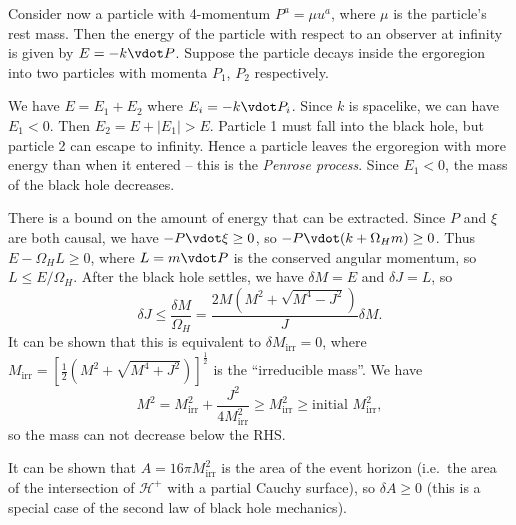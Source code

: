 \documentclass{jknotes}
\begin{document}
Consider now a particle with 4-momentum \(P^a = \mu u^a\), where \(\mu\) is the particle's rest mass. Then the energy of the particle with respect to an observer at infinity is given by \(E=-k\vdot P\). Suppose the particle decays inside the ergoregion into two particles with momenta \(P_1\), \(P_2\) respectively.
\begin{figure}[H]
    \centering
\end{figure}
We have \(E = E_1 + E_2\) where \(E_i=-k\vdot P_i\). Since \(k\) is spacelike, we can have \(E_1<0\). Then \(E_2=E+|E_1|>E\). Particle 1 must fall into the black hole, but particle 2 can escape to infinity. Hence a particle leaves the ergoregion with more energy than when it entered -- this is the \emph{Penrose process}. Since \(E_1<0\), the mass of the black hole decreases.

There is a bound on the amount of energy that can be extracted. Since \(P\) and \(\xi\) are both causal, we have \(-P\vdot\xi\ge0\), so \(-P\vdot(k+\Omega_H m)\ge 0\). Thus \(E-\Omega_HL\ge0\), where \(L=m\vdot P\) is the conserved angular momentum, so \(L\le E/\Omega_H\). After the black hole settles, we have \(\delta M=E\) and \(\delta J = L\), so
\begin{equation}
    \delta J \le \frac{\delta M}{\Omega_H} = \frac{2M(M^2+\sqrt{M^4-J^2})}{J}\delta M.
\end{equation}
It can be shown that this is equivalent to \(\delta M_{\text{irr}} = 0\), where \(M_{\text{irr}} = \left[\frac{1}{2}\left(M^2+\sqrt{M^4+J^2}\right)\right]^{\frac{1}{2}}\) is the ``irreducible mass''. We have
\begin{equation}
    M^2 = M_{\text{irr}}^2 + \frac{J^2}{4M_{\text{irr}}^2} \ge M_{\text{irr}}^2 \ge \text{initial } M_{\text{irr}}^2,
\end{equation}
so the mass can not decrease below the RHS.

It can be shown that \(A=16\pi M_{\text{irr}}^2\) is the area of the event horizon (i.e.\ the area of the intersection of \(\mathcal{H}^+\) with a partial Cauchy surface), so \(\delta A \ge0\) (this is a special case of the second law of black hole mechanics).
\end{document}
